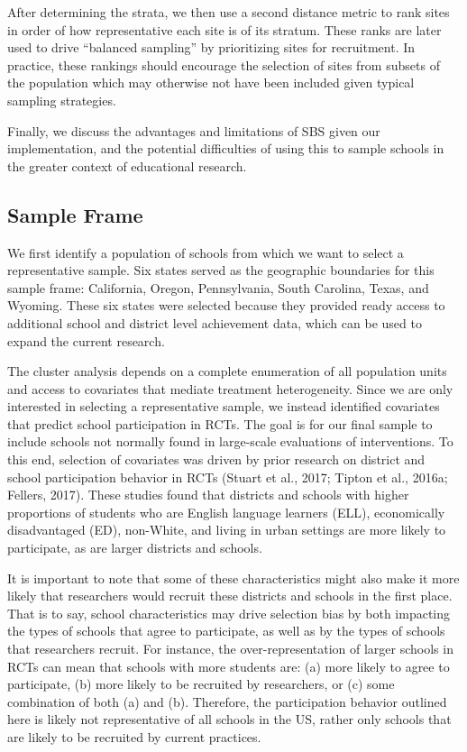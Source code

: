 \documentclass[man,floatsintext]{apa6}
\begin{document}
After determining the strata, we then use a second distance metric to rank sites in order of how representative each site is of its stratum. These ranks are later used to drive \enquote{balanced sampling} by prioritizing sites for recruitment. In practice, these rankings should encourage the selection of sites from subsets of the population which may otherwise not have been included given typical sampling strategies.

Finally, we discuss the advantages and limitations of SBS given our implementation, and the potential difficulties of using this to sample schools in the greater context of educational research.

\hypertarget{sample-frame}{%
\subsection{Sample Frame}\label{sample-frame}}

We first identify a population of schools from which we want to select a representative sample. Six states served as the geographic boundaries for this sample frame: California, Oregon, Pennsylvania, South Carolina, Texas, and Wyoming. These six states were selected because they provided ready access to additional school and district level achievement data, which can be used to expand the current research.

The cluster analysis depends on a complete enumeration of all population units and access to covariates that mediate treatment heterogeneity. Since we are only interested in selecting a representative sample, we instead identified covariates that predict school participation in RCTs. The goal is for our final sample to include schools not normally found in large-scale evaluations of interventions. To this end, selection of covariates was driven by prior research on district and school participation behavior in RCTs (Stuart et al., 2017; Tipton et al., 2016a; Fellers, 2017). These studies found that districts and schools with higher proportions of students who are English language learners (ELL), economically disadvantaged (ED), non-White, and living in urban settings are more likely to participate, as are larger districts and schools.

It is important to note that some of these characteristics might also make it more likely that researchers would recruit these districts and schools in the first place. That is to say, school characteristics may drive selection bias by both impacting the types of schools that agree to participate, as well as by the types of schools that researchers recruit. For instance, the over-representation of larger schools in RCTs can mean that schools with more students are: (a) more likely to agree to participate, (b) more likely to be recruited by researchers, or (c) some combination of both (a) and (b). Therefore, the participation behavior outlined here is likely not representative of all schools in the US, rather only schools that are likely to be recruited by current practices.
\end{document}
